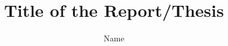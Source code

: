\documentclass[phd,thesis,twoside]{iisc}
\title{Title of the Report/Thesis}
\author{Name}
\date{\monthname~\number\year}
\begin{document}
\maketitle %
\makededication %
\makecertificate %
\makedeclaration %
\makeacknowledgements %
\makeabstract %
\makepublications %
\maketableofcontents %
\makelistoffigures %
\makelistoftables %
\makelistofalgorithms %
\makeabbreviations %
\makenomenclature %

\makechaptersettings 










\makebibsettings



\makeappendixsettings



\makeindexsettings
\end{document}
